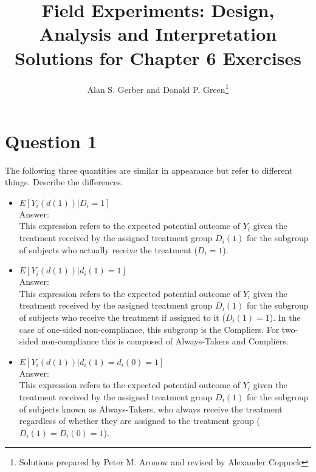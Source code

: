 \documentclass[11pt,notitlepage]{article}\usepackage[]{graphicx}\usepackage[]{color}
\title{Field Experiments: Design, Analysis and Interpretation \\
Solutions for Chapter 6 Exercises}
\author{Alan S. Gerber and Donald P. Green\footnote{Solutions prepared by Peter M. Aronow and revised by Alexander Coppock}}
\date{\vspace{-5ex}}
\begin{document}
\maketitle


\section*{Question 1}
The following three quantities are similar in appearance but refer to different things. Describe the differences.
\begin{itemize}
\item $E[Y_i(d(1))|D_i = 1]$ \\
Answer:\\
This expression refers to the expected potential outcome of $Y_i$ given the treatment received by the assigned treatment group $D_i(1)$ for the subgroup of subjects who actually receive the treatment ($D_i=1$).
\item $E[Y_i(d(1))|d_i(1) = 1]$ \\
Answer:\\
This expression refers to the expected potential outcome of $Y_i$ given the treatment received by the assigned treatment group $D_i(1)$ for the subgroup of subjects who receive the treatment if assigned to it ($D_i(1)=1$). In the case of one-sided non-compliance, this subgroup is the Compliers. For two-sided non-compliance this is composed of Always-Takers and Compliers.
\item $E[Y_i(d(1))|d_i(1) = d_i(0) = 1]$\\
Answer:\\
This expression refers to the expected potential outcome of $Y_i$ given the treatment received by the assigned treatment group $D_i (1)$ for the subgroup of subjects known as Always-Takers, who always receive the treatment regardless of whether they are assigned to the treatment group ($D_i (1)=D_i (0)=1$). 

\end{itemize}
\end{document}
